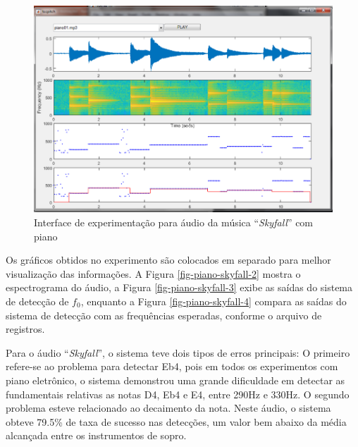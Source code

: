 \begin{figure}
	\centering
	\includegraphics[width=0.75\linewidth]{pasta1_figuras/piano-skyfall.png}
	\caption{Interface de experimentação para áudio da música ``\textit{Skyfall}'' com piano}
	\label{fig-piano-skyfall}
\end{figure}

Os gráficos obtidos no experimento são colocados em separado para melhor visualização das informações. A Figura \ref{fig-piano-skyfall-2} mostra o espectrograma do áudio, a Figura \ref{fig-piano-skyfall-3} exibe as saídas do sistema de detecção de $f_0$, enquanto a Figura \ref{fig-piano-skyfall-4} compara as saídas do sistema de detecção com as frequências esperadas, conforme o arquivo de registros.


Para o áudio ``\textit{Skyfall}'', o sistema teve dois tipos de erros principais: O primeiro refere-se ao problema para detectar Eb4, pois em todos os experimentos com piano eletrônico, o sistema demonstrou uma grande dificuldade em detectar as fundamentais relativas as notas D4, Eb4 e E4, entre 290Hz e 330Hz. O segundo problema esteve relacionado ao  decaimento da nota. Neste áudio, o sistema obteve 79.5\% de taxa de sucesso nas detecções, um valor bem abaixo da média alcançada entre os instrumentos de sopro.

